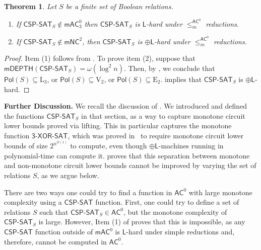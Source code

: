 \documentclass[10pt,a4paper]{article}
\newtheorem{theorem}{Theorem}[section]
\newcommand{\complexityfont}[1]{\mathsf{#1}}
\newcommand{\monclass}[1]{\mathsf{m}#1}
\def\mNC          {\monclass{\NC}}
\def\AC           {\complexityfont{AC}}
\def\pL           {\oplus\complexityfont{L}}
\def\mAC          {\complexityfont{mAC}}
\def\NC           {\complexityfont{NC}}
\renewcommand{\L} {\complexityfont{L}}
\newcommand{\txorsat}{\mathsf{3\mbox{-}XOR\mbox{-}SAT}}
\newcommand{\mdepth}[1]{\mathsf{mDEPTH}({#1})}
\def\sseq{\subseteq}
\newcommand{\CSPSAT}{\mathsf{CSP}\text{-}\mathsf{SAT}}
\newcommand{\CSPf}[1]{\mathsf{CSP}\text{-}\mathsf{SAT}_{#1}}
\newcommand{\Pol}{\mathsf{Pol}}
\newcommand{\acmred}{\leq^{\AC^0}_m\!}
\newcommand{\clonefont}[1]{\mathrm{#1}}
\begin{document}
\begin{theorem}
    \label{thm:cspsat-hard}
    Let $S$ be a finite set of Boolean relations.
    \begin{enumerate}
        \item 
            If
            $\CSPf{S} \notin 
            \mAC^0_3$
            then $\CSPf{S}$ is $\L$-hard
            under
            $\acmred$ reductions.
        \item 
            If
            $\CSPf{S} \notin \mNC^2$,
            then $\CSPf{S}$ is $\pL$-hard
            under
            $\acmred$ reductions.
    \end{enumerate}
\end{theorem}
\begin{proof}
    Item (1) follows 
            from .
    To prove item (2),
            suppose that $\mdepth{\CSPf{S}} = {\omega(\log^2 n)}$.
            Then, by ,
            we conclude that 
            $\Pol(S) \sseq \clonefont{L_3}$, or
            $\Pol(S) \sseq \clonefont{V_2}$, or
            $\Pol(S) \sseq \clonefont{E_2}$.
            implies that
            $\CSPf{S}$ is $\pL$-hard.
            \qedhere
\end{proof}

\noindent \textbf{Further Discussion.} We recall the discussion of .
We introduced and defined the functions $\CSPf{S}$ in that section,
as a way to capture monotone circuit lower bounds proved via lifting.
This in particular captures the monotone function $\txorsat$,
which was proved in~\cite{gkrs19} to require monotone circuit lower bounds
of size $2^{n^{\Omega(1)}}$ to compute, even though 
$\pL$-machines running in 
polynomial-time
can compute it.
proves that this separation between monotone and non-monotone circuit lower
bounds cannot be improved by varying the set of relations $S$, as we argue
below.

There are two ways one could try to find a function in $\AC^0$
with large monotone complexity using a $\CSPSAT$ function.
First, one could try to define a set of relations $S$
such that $\CSPf{S} \in \AC^0$, but the monotone complexity of
$\CSPf{S}$ is large.
However, 
Item (1) of 
proves that this is impossible,
as any $\CSPSAT$ function outside of $\mAC^0$
is $\L$-hard under simple reductions and, therefore, cannot be computed in $\AC^0$.
\end{document}
